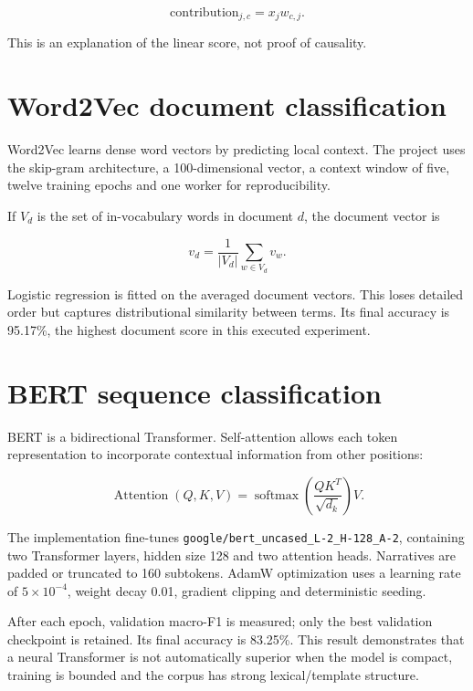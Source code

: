 \documentclass[12pt,a4paper]{report}
\newcommand{\code}[1]{\texttt{#1}}
\begin{document}
\begin{equation}
\text{contribution}_{j,c}=x_jw_{c,j}.
\end{equation}

This is an explanation of the linear score, not proof of causality.

\section{Word2Vec document classification}

Word2Vec learns dense word vectors by predicting local context. The project uses the skip-gram architecture, a 100-dimensional vector, a context window of five, twelve training epochs and one worker for reproducibility.

If $V_d$ is the set of in-vocabulary words in document $d$, the document vector is

\begin{equation}
v_d=\frac{1}{|V_d|}\sum_{w\in V_d}v_w.
\end{equation}

Logistic regression is fitted on the averaged document vectors. This loses detailed order but captures distributional similarity between terms. Its final accuracy is 95.17\%, the highest document score in this executed experiment.

\section{BERT sequence classification}

BERT is a bidirectional Transformer. Self-attention allows each token representation to incorporate contextual information from other positions:

\begin{equation}
\operatorname{Attention}(Q,K,V)=\operatorname{softmax}\left(\frac{QK^T}{\sqrt{d_k}}\right)V.
\end{equation}

The implementation fine-tunes \code{google/bert\_uncased\_L-2\_H-128\_A-2}, containing two Transformer layers, hidden size 128 and two attention heads. Narratives are padded or truncated to 160 subtokens. AdamW optimization uses a learning rate of $5\times10^{-4}$, weight decay 0.01, gradient clipping and deterministic seeding.

After each epoch, validation macro-F1 is measured; only the best validation checkpoint is retained. Its final accuracy is 83.25\%. This result demonstrates that a neural Transformer is not automatically superior when the model is compact, training is bounded and the corpus has strong lexical/template structure.
\end{document}
